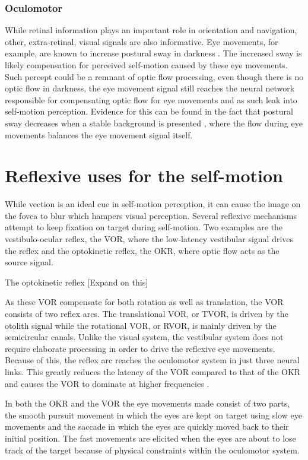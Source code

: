 \subsubsection{Oculomotor}
While retinal information plays an important role in orientation and navigation, other, extra-retinal, visual signals are also informative. Eye movements, for example, are known to increase postural sway in darkness \cite{glasauer2005}. The increased sway is likely compensation for perceived self-motion caused by these eye movements. Such percept could be a remnant of optic flow processing, even though there is no optic flow in darkness, the eye movement signal still reaches the neural network responsible for compensating optic flow for eye movements and as such leak into self-motion perception. Evidence for this can be found in the fact that postural sway decreases when a stable background is presented \cite{glasauer2005,rodrigues2015}, where the  flow during eye movements balances the eye movement signal itself.


\section{Reflexive uses for the self-motion}
While vection is an ideal cue in self-motion perception, it can cause the image on the fovea to blur which hampers visual perception. Several reflexive mechanisms attempt to keep fixation on target during self-motion. Two examples are the vestibulo-ocular reflex, the VOR, where the low-latency vestibular signal drives the reflex and the optokinetic reflex, the OKR, where optic flow acts as the source signal.

The optokinetic reflex [Expand on this]

As these VOR compensate for both rotation as well as translation, the VOR consists of two reflex arcs. The translational VOR, or TVOR, is driven by the otolith signal while the rotational VOR, or RVOR, is mainly driven by the semicircular canals. Unlike the visual system, the vestibular system does not require elaborate processing in order to drive the reflexive eye movements. Because of this, the reflex arc reaches the oculomotor system in just three neural links. This greatly reduces the latency of the VOR compared to that of the OKR and causes the VOR to dominate at higher frequencies \cite{schweigard1997}.

In both the OKR and the VOR the eye movements made consist of two parts, the smooth pursuit movement in which the eyes are kept on target using slow eye movements and the saccade in which the eyes are quickly moved back to their initial position. The fast movements are elicited when the eyes are about to lose track of the target because of physical constraints within the oculomotor system.

